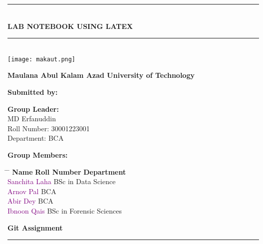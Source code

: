 \documentclass[12pt,a4paper]{article}
\begin{document}
	\begin{titlepage}
		\centering
		\vspace*{1cm}
		
		\noindent\rule{\textwidth}{1pt}\\[0.3cm]
		
		{\Huge\textbf{\color{blue}LAB NOTEBOOK USING LATEX}}\\
		\vspace{0.5cm}
		\noindent\rule{\textwidth}{1pt}\\[1.5cm]
		
		\texttt{[image: makaut.png]} %
		\vspace{0.8cm}
		
		\Large\textbf{\color{blue}Maulana Abul Kalam Azad University of Technology}\\
		\vspace{0.8cm}
		
		\Large\textbf{Submitted by:}\\
		\vspace{0.3cm}
		
		\textbf{\color{red}Group Leader:}\\
		\vspace{0.2cm}
		\Large MD Erfanuddin\\
		\large Roll Number: 30001223001\\
		Department: BCA\\
		
		\vspace{1cm}
		
		\textbf{\color{green}Group Members:}\\
		\vspace{0.3cm}
		
		\large
		\begin{tabbing}
			\hspace{4cm} \= \hspace{8cm} \= \kill
			\textbf{Name} \> \textbf{Roll Number} \> \textbf{Department} \\
			\textcolor{purple}{Sanchita Laha}  \> BSc in Data Science \\
			\textcolor{purple}{Arnov Pal}  \> BCA \\
			\textcolor{purple}{Abir Dey}  \> BCA \\
			\textcolor{purple}{Ibnoon Qais}  \> BSc in Forensic Sciences \\
		\end{tabbing}
		
		\vfill
		
		\Large\textbf{\color{orange}Git Assignment}\\
		
		\vspace{1.5cm}
		\noindent\rule{\textwidth}{1pt}
		
	\end{titlepage}
\end{document}
